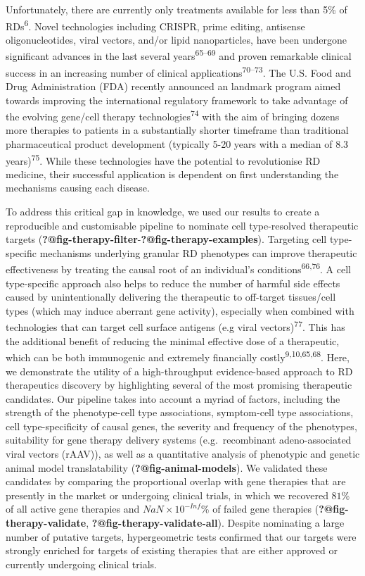 \documentclass[
]{report}
\begin{document}
Unfortunately, there are currently only treatments available for less
than 5\% of RDs\textsuperscript{6}. Novel technologies including CRISPR,
prime editing, antisense oligonucleotides, viral vectors, and/or lipid
nanoparticles, have been undergone significant advances in the last
several years\textsuperscript{65--69} and proven remarkable clinical
success in an increasing number of clinical
applications\textsuperscript{70--73}. The U.S. Food and Drug
Administration (FDA) recently announced an landmark program aimed
towards improving the international regulatory framework to take
advantage of the evolving gene/cell therapy
technologies\textsuperscript{74} with the aim of bringing dozens more
therapies to patients in a substantially shorter timeframe than
traditional pharmaceutical product development (typically 5-20 years
with a median of 8.3 years)\textsuperscript{75}. While these
technologies have the potential to revolutionise RD medicine, their
successful application is dependent on first understanding the
mechanisms causing each disease.

To address this critical gap in knowledge, we used our results to create
a reproducible and customisable pipeline to nominate cell type-resolved
therapeutic targets
(\textbf{?@fig-therapy-filter}-\textbf{?@fig-therapy-examples}).
Targeting cell type-specific mechanisms underlying granular RD
phenotypes can improve therapeutic effectiveness by treating the causal
root of an individual's conditions\textsuperscript{66,76}. A cell
type-specific approach also helps to reduce the number of harmful side
effects caused by unintentionally delivering the therapeutic to
off-target tissues/cell types (which may induce aberrant gene activity),
especially when combined with technologies that can target cell surface
antigens (e.g viral vectors)\textsuperscript{77}. This has the
additional benefit of reducing the minimal effective dose of a
therapeutic, which can be both immunogenic and extremely financially
costly\textsuperscript{9,10,65,68}. Here, we demonstrate the utility of
a high-throughput evidence-based approach to RD therapeutics discovery
by highlighting several of the most promising therapeutic candidates.
Our pipeline takes into account a myriad of factors, including the
strength of the phenotype-cell type associations, symptom-cell type
associations, cell type-specificity of causal genes, the severity and
frequency of the phenotypes, suitability for gene therapy delivery
systems (e.g.~recombinant adeno-associated viral vectors (rAAV)), as
well as a quantitative analysis of phenotypic and genetic animal model
translatability (\textbf{?@fig-animal-models}). We validated these
candidates by comparing the proportional overlap with gene therapies
that are presently in the market or undergoing clinical trials, in which
we recovered \(81\)\% of all active gene therapies and
\(NaN \times 10^{-Inf}\)\% of failed gene therapies
(\textbf{?@fig-therapy-validate}, \textbf{?@fig-therapy-validate-all}).
Despite nominating a large number of putative targets, hypergeometric
tests confirmed that our targets were strongly enriched for targets of
existing therapies that are either approved or currently undergoing
clinical trials.
\end{document}
